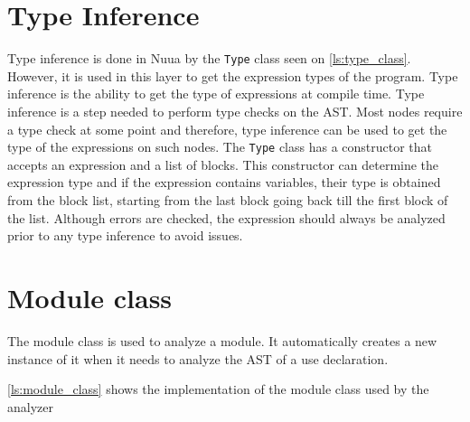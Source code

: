 \section{Type Inference}

Type inference is done in Nuua by the \texttt{Type} class seen on \autoref{ls:type_class}. However, it is used in this layer to get
the expression types of the program. Type inference is the ability to get the type of expressions at compile time. Type inference is
a step needed to perform type checks on the AST. Most nodes require a type check at some point and therefore, type inference can be used
to get the type of the expressions on such nodes. The \texttt{Type} class has a constructor that accepts an expression and a list of blocks.
This constructor can determine the expression type and if the expression contains variables, their type is obtained from the block list,
starting from the last block going back till the first block of the list. Although errors are checked, the expression should always be analyzed prior
to any type inference to avoid issues.

\section{Module class}

The module class is used to analyze a module. It automatically creates a new instance of it when it needs to analyze
the AST of a use declaration.

\autoref{ls:module_class} shows the implementation of the module class used by the analyzer\\


